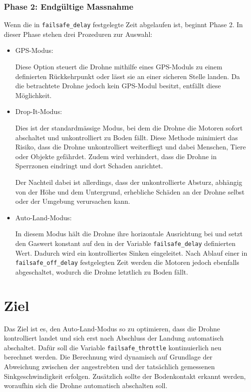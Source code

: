 \subsubsection{Phase 2: Endgültige Massnahme}
Wenn die in \texttt{failsafe\_delay} festgelegte Zeit abgelaufen ist, beginnt Phase 2. In dieser Phase stehen drei Prozeduren zur Auswahl:
\begin{itemize}
\item
GPS-Modus:

Diese Option steuert die Drohne mithilfe eines GPS-Moduls zu einem definierten Rückkehrpunkt oder lässt sie an einer sicheren Stelle landen. Da die betrachtete Drohne jedoch kein GPS-Modul besitzt, entfällt diese Möglichkeit.
\item
Drop-It-Modus:

Dies ist der standardmässige Modus, bei dem die Drohne die Motoren sofort abschaltet und unkontrolliert zu Boden fällt. Diese Methode minimiert das Risiko, dass die Drohne unkontrolliert weiterfliegt und dabei Menschen, Tiere oder Objekte gefährdet. Zudem wird verhindert, dass die Drohne in Sperrzonen eindringt und dort Schaden anrichtet.

Der Nachteil dabei ist allerdings, dass der unkontrollierte Absturz, abhängig von der Höhe und dem Untergrund, erhebliche Schäden an der Drohne selbst oder der Umgebung verursachen kann.
\item
Auto-Land-Modus:

In diesem Modus hält die Drohne ihre horizontale Ausrichtung bei und setzt den Gaswert konstant auf den in der Variable \texttt{failsafe\_delay} definierten Wert. Dadurch wird ein kontrolliertes Sinken eingeleitet. Nach Ablauf einer in \texttt{failsafe\_off\_delay} festgelegten Zeit werden die Motoren jedoch ebenfalls abgeschaltet, wodurch die Drohne letztlich zu Boden fällt.
\end{itemize}
\section{Ziel}\label{sec:ziel}
Das Ziel ist es, den Auto-Land-Modus so zu optimieren, dass die Drohne kontrolliert landet und sich erst nach Abschluss der Landung automatisch abschaltet. Dafür soll die Variable \texttt{failsafe\_throttle} kontinuierlich neu berechnet werden. Die Berechnung wird dynamisch auf Grundlage der Abweichung zwischen der angestrebten und der tatsächlich gemessenen Sinkgeschwindigkeit erfolgen. Zusätzlich sollte der Bodenkontakt erkannt werden, woraufhin sich die Drohne automatisch abschalten soll.
 

